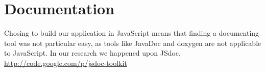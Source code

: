 \section{Documentation} %
\label{sec:Documentation}
Chosing to build our application in JavaScript means that finding a documenting tool was not particular easy, as tools like JavaDoc and doxygen are not applicable to JavaScript. In our research we happened upon JSdoc, \url{http://code.google.com/p/jsdoc-toolkit}
